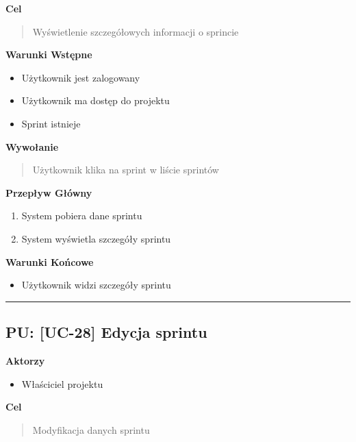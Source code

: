 \vspace{0.2cm}
\noindent\textbf{Cel}
\begin{quote}
    Wyświetlenie szczegółowych informacji o sprincie
\end{quote}

\vspace{0.2cm}
\noindent\textbf{Warunki Wstępne}
\begin{itemize}
    \item Użytkownik jest zalogowany
    \item Użytkownik ma dostęp do projektu
    \item Sprint istnieje
\end{itemize}

\vspace{0.2cm}
\noindent\textbf{Wywołanie}
\begin{quote}
    Użytkownik klika na sprint w liście sprintów
\end{quote}

\vspace{0.2cm}
\noindent\textbf{Przepływ Główny}
\begin{enumerate}
    \item System pobiera dane sprintu
    \item System wyświetla szczegóły sprintu
\end{enumerate}

\vspace{0.2cm}
\noindent\textbf{Warunki Końcowe}
\begin{itemize}
    \item Użytkownik widzi szczegóły sprintu
\end{itemize}


\hrule
\vspace{1cm}

\subsection*{PU: [UC-28] Edycja sprintu}

\noindent\textbf{Aktorzy}
\begin{itemize}
    \item Właściciel projektu
\end{itemize}

\vspace{0.2cm}
\noindent\textbf{Cel}
\begin{quote}
    Modyfikacja danych sprintu
\end{quote}

